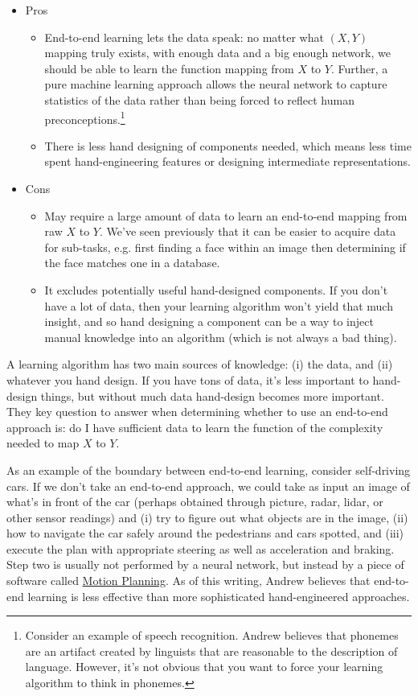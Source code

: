 \documentclass[12pt]{article}
\begin{document}
\begin{itemize}   \item Pros
    \begin{itemize}       \item End-to-end learning lets the data speak: no matter what $(X,Y)$ mapping truly exists,
        with enough data and a big enough network, we should be able to learn the function mapping
        from $X$ to $Y$. Further, a pure machine learning approach allows the neural network to capture statistics
        of the data rather than being forced to reflect human preconceptions.\footnote{Consider an example of speech recognition. 
        Andrew believes that phonemes are an artifact created by linguists that are reasonable to the description of language. 
        However, it's not obvious that you want to force your learning algorithm to think in phonemes.}
    \item There is less hand designing of components needed, which means less time spent hand-engineering features or
      designing intermediate representations.     \end{itemize}
  \item Cons
    \begin{itemize}     \item May require a large amount of data to learn an end-to-end mapping from raw $X$ to $Y$. 
      We've seen previously that it can be easier to acquire
      data for sub-tasks, e.g. first finding a face within an image then determining if the face matches
      one in a database.
    \item It excludes potentially useful hand-designed components. If you don't have a lot of data, then
      your learning algorithm won't yield that much insight, and so hand designing a component can
      be a way to inject manual knowledge into an algorithm (which is not always a bad thing).     \end{itemize} \end{itemize} 

A learning algorithm has two main sources of knowledge: (i) the data, and (ii) whatever you hand design. If you have tons of data,
it's less important to hand-design things, but without much data hand-design becomes more important. They key question to answer when determining whether to use an end-to-end approach is: do I have sufficient data to learn the function of the complexity needed
to map $X$ to $Y$.

As an example of the boundary between end-to-end learning, consider self-driving cars. If we don't take an end-to-end approach,
we could take as input an image of what's in front of the car (perhaps obtained through picture, radar, lidar, or other sensor readings) and (i) try to figure out what objects are in the image, (ii) how to navigate the car safely around the pedestrians and cars spotted, and (iii) execute the plan with appropriate steering as well as acceleration and braking. Step two is usually not performed by a neural network, but instead by a piece of software called \href{https://en.wikipedia.org/wiki/Motion_planning}{Motion Planning}. As of this writing, Andrew believes that end-to-end learning is less effective than more sophisticated hand-engineered approaches.
\end{document}
